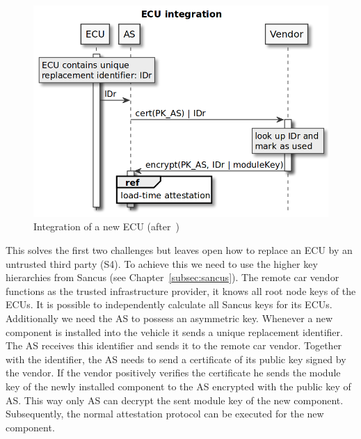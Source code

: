 \begin{figure}[ht]
    \centering
    \captionsetup{justification=centering}
	\includegraphics[width=1\linewidth]{Figures/VulCAN_ecu_replacement.png}
	\caption[]{Integration of a new ECU (after~\cite{VanBulck2017})}\label{fig:vulcan_ecu_replacement}
\end{figure}

This solves the first two challenges but leaves open how to replace an ECU by an
untrusted third party (S4). To achieve this we need to use the higher key
hierarchies from Sancus (see Chapter~\ref{subsec:sancus}). The remote car vendor
functions as the trusted infrastructure provider, it knows all root node keys of
the ECUs. It is possible to independently calculate all Sancus keys for its
ECUs. Additionally we need the AS to possess an asymmetric key. Whenever a new
component is installed into the vehicle it sends a unique replacement
identifier. The AS receives this identifier and sends it to the remote car
vendor. Together with the identifier, the AS needs to send a certificate of its
public key signed by the vendor. If the vendor positively verifies the
certificate he sends the module key of the newly installed component to the AS
encrypted with the public key of AS\@. This way only AS can decrypt the sent
module key of the new component. Subsequently, the normal attestation protocol
can be executed for the new component.

